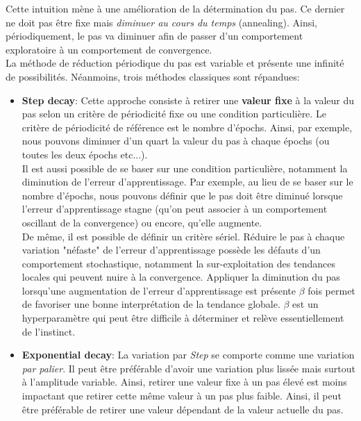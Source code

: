 \noindent Cette intuition mène à une amélioration de la détermination du pas. Ce dernier ne doit pas être fixe mais \textit{diminuer au cours du temps} (annealing\cite{annealing}). Ainsi, périodiquement, le pas va diminuer afin de passer d'un comportement exploratoire à un comportement de convergence.\\

\noindent La méthode de réduction périodique du pas est variable et présente une infinité de possibilités. Néanmoins, trois méthodes classiques sont répandues:
\begin{itemize}
    \item \textbf{Step decay}: Cette approche consiste à retirer une \textbf{valeur fixe} à la valeur du pas selon un critère de périodicité fixe ou une condition particulière. Le critère de périodicité de référence est le nombre d'épochs. Ainsi, par exemple, nous pouvons diminuer d'un quart la valeur du pas à chaque épochs (ou toutes les deux épochs etc...).\\

    Il est aussi possible de se baser sur une condition particulière, notamment la diminution de l'erreur d'apprentissage. Par exemple, au lieu de se baser sur le nombre d'épochs, nous pouvons définir que le pas doit être diminué lorsque l'erreur d'apprentissage stagne (qu'on peut associer à un comportement oscillant de la convergence) ou encore, qu'elle augmente. \\

    De même, il est possible de définir un critère sériel. Réduire le pas à chaque variation "néfaste" de l'erreur d'apprentissage possède les défauts d'un comportement stochastique, notamment la sur-exploitation des tendances locales qui peuvent nuire à la convergence. Appliquer la diminution du pas lorsqu'une augmentation de l'erreur d'apprentissage est présente $\beta$ fois permet de favoriser une bonne interprétation de la tendance globale. $\beta$ est un hyperparamètre qui peut être difficile à déterminer et relève essentiellement de l'instinct.

    \item \textbf{Exponential decay}: La variation par \textit{Step} se comporte comme une variation \textit{par palier}. Il peut être préférable d'avoir une variation plus lissée mais surtout à l'amplitude variable. Ainsi, retirer une valeur fixe à un pas élevé est moins impactant que retirer cette même valeur à un pas plus faible. Ainsi, il peut être préférable de retirer une valeur dépendant de la valeur actuelle du pas.\\


\end{itemize}
